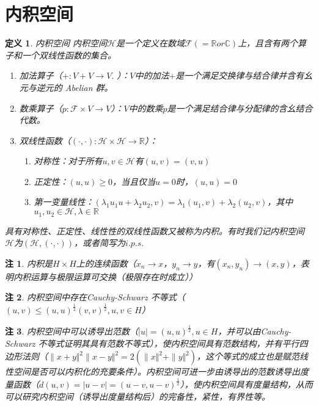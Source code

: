 \documentclass{article}                     %
\numberwithin{equation}{section}            %
\numberwithin{figure}{section}              %
\numberwithin{table}{section}               %
\newtheorem{definition}{\indent 定义}[section]
\newtheorem{remark}{\indent 注}[section]
\begin{document}
\section{内积空间}
\begin{definition}内积空间
    内积空间$\mathcal{H} $是一个定义在数域$\mathcal{F} (=\mathbb{R} or \mathbb{C} )$上，且含有两个算子和一个双线性函数的集合。
    \begin{enumerate}
        \item 加法算子（$+:V+V\to V.$ ）：$V$中的加法$+$是一个满足交换律与结合律并含有幺元与逆元的 Abelian 群。
        \item 数乘算子（$p:\mathcal{F} \times V\to V$）：$V$中的数乘$p$是一个满足结合律与分配律的含幺结合代数。
        \item 双线性函数（$(\cdot,\cdot) :\mathcal{H}\times \mathcal{H} \to \mathbb{R} $）：
        \begin{enumerate}
            \item 对称性：对于所有$u,v\in \mathcal{H} $有$(u,v)=(v,u) $
            \item 正定性：$(u,u)\ge 0$，当且仅当$u=0$时，$(u,u)=0$
            \item 第一变量线性：$(\lambda_1u_1u+\lambda_2u_2,v)=\lambda_1(u_1,v)+\lambda_2(u_2,v)$，其中$u_1,u_2\in \mathcal{H},\lambda\in \mathbb{R} $
        \end{enumerate}
    \end{enumerate}
    具有对称性、正定性、线性性的双线性函数又被称为内积。有时我们记内积空间$\mathcal{H}$为$(\mathcal{H},(\cdot,\cdot) )$，或者简写为$i.p.s.$
\end{definition}
\begin{remark}
    内积是$H\times H$上的连续函数（$x_n\to x$，$y_n\to y$，有$(x_n,y_n)\to(x,y)$，表明内积运算与极限运算可交换（极限存在时成立））
\end{remark}
\begin{remark}
    内积空间中存在Cauchy-Schwarz 不等式（$(u,v)\le (u,u)^{\frac{1}{2}}(v,v)^{\frac{1}{2}},u,v\in H$）
\end{remark}
\begin{remark}
    内积空间中可以诱导出范数（$|u|=(u,u)^{\frac{1}{2}},u\in H$，并可以由Cauchy-Schwarz 不等式证明其具有范数不等式），使内积空间具有范数结构，并有平行四边形法则（$\| x+y\Vert^2 \| x-y\Vert^2=2( \| x\Vert^2 +\| y\Vert^2 )$，这个等式的成立也是赋范线性空间是否可以内积化的充要条件）。内积空间可进一步由诱导出的范数诱导出度量函数（$d(u,v)=|u-v|=(u-v,u-v)^{\frac{1}{2}}$），使内积空间具有度量结构，从而可以研究内积空间（诱导出度量结构后）的完备性，紧性，有界性等。
\end{remark}
\end{document}
